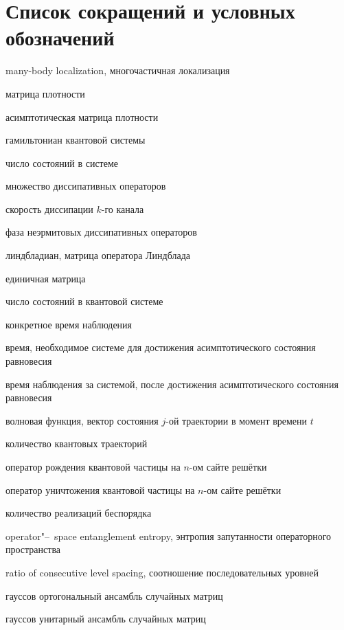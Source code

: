 \chapter*{Список сокращений и условных обозначений} %
\begin{description}[align=right,leftmargin=3.5cm]
\item[MBL] many-body localization, многочастичная локализация
\item[\(\rho\)] матрица плотности
\item[\(\rho^A\)] асимптотическая матрица плотности
\item[\(H\)] гамильтониан квантовой системы
\item[\(S\)] число состояний в системе
\item[\(\{V_k\}\)] множество диссипативных операторов
\item[\(\gamma_k\)] скорость диссипации \(k\)-го канала
\item[\(\alpha\)] фаза неэрмитовых диссипативных операторов
\item[\(L\)] линдбладиан, матрица оператора Линдблада
\item[\(\idmtx\)] единичная матрица
\item[\(N\)] число состояний в квантовой системе
\item[\(t^C\)] конкретное время наблюдения
\item[\(t^A\)] время, необходимое системе для достижения асимптотического состояния равновесия
\item[\(t^O\)] время наблюдения за системой, после достижения асимптотического состояния равновесия
\item[\(| \psi_j (t) \rangle\)] волновая функция, вектор состояния \(j\)-ой траектории в момент времени \(t\)
\item[\(M_r\)] количество квантовых траекторий
\item[\(b_n\)] оператор рождения квантовой частицы на \(n\)-ом сайте решётки
\item[\(b^\dagger_n\)] оператор уничтожения квантовой частицы на \(n\)-ом сайте решётки
\item[\(N_r\)] количество реализаций беспорядка
\item[OSEE, \(S^\natural\)] operator"--~space entanglement entropy, энтропия запутанности операторного пространства
\item[RCLS,  \(r\)] ratio of consecutive level spacing, соотношение последовательных уровней
\item[GOE] гауссов ортогональный ансамбль случайных матриц
\item[GUE] гауссов унитарный ансамбль случайных матриц
\end{description}
